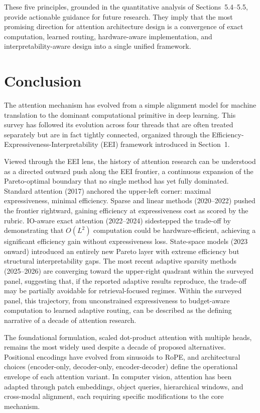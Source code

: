 \documentclass[10pt,twocolumn]{article}
\begin{document}
These five principles, grounded in the quantitative analysis of Sections~5.4--5.5, provide actionable guidance for future research. They imply that the most promising direction for attention architecture design is a convergence of exact computation, learned routing, hardware-aware implementation, and interpretability-aware design into a single unified framework.

\section*{Conclusion}

The attention mechanism has evolved from a simple alignment model for machine translation to the dominant computational primitive in deep learning. This survey has followed its evolution across four threads that are often treated separately but are in fact tightly connected, organized through the Efficiency-Expressiveness-Interpretability (EEI) framework introduced in Section~1.

Viewed through the EEI lens, the history of attention research can be understood as a directed outward push along the EEI frontier, a continuous expansion of the Pareto-optimal boundary that no single method has yet fully dominated. Standard attention (2017) anchored the upper-left corner: maximal expressiveness, minimal efficiency. Sparse and linear methods (2020--2022) pushed the frontier rightward, gaining efficiency at expressiveness cost as scored by the rubric. IO-aware exact attention (2022--2024) sidestepped the trade-off by demonstrating that $O(L^2)$ computation could be hardware-efficient, achieving a significant efficiency gain without expressiveness loss. State-space models (2023 onward) introduced an entirely new Pareto layer with extreme efficiency but structural interpretability gaps. The most recent adaptive sparsity methods (2025--2026) are converging toward the upper-right quadrant within the surveyed panel, suggesting that, if the reported adaptive results reproduce, the trade-off may be partially avoidable for retrieval-focused regimes. Within the surveyed panel, this trajectory, from unconstrained expressiveness to budget-aware computation to learned adaptive routing, can be described as the defining narrative of a decade of attention research.

The foundational formulation, scaled dot-product attention with multiple heads, remains the most widely used despite a decade of proposed alternatives. Positional encodings have evolved from sinusoids to RoPE, and architectural choices (encoder-only, decoder-only, encoder-decoder) define the operational envelope of each attention variant. In computer vision, attention has been adapted through patch embeddings, object queries, hierarchical windows, and cross-modal alignment, each requiring specific modifications to the core mechanism.
\end{document}
